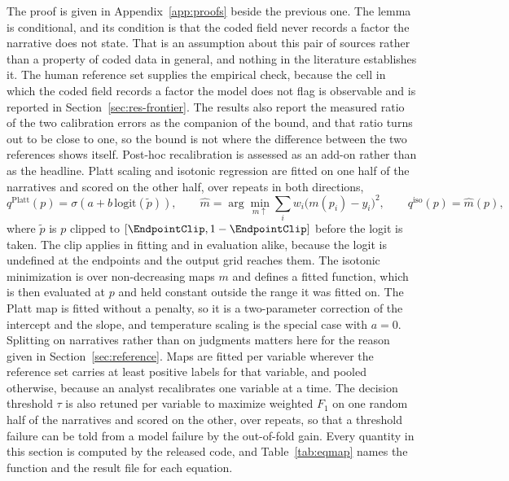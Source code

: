 The proof is given in Appendix~\ref{app:proofs} beside the previous one. The lemma is
conditional, and its condition is that the coded field never records a factor the narrative
does not state. That is an assumption about this pair of sources rather than a property of
coded data in general, and nothing in the literature establishes it. The human reference set
supplies the empirical check, because the cell in which the coded field records a factor the
model does not flag is observable and is reported in Section~\ref{sec:res-frontier}. The
results also report the measured ratio of the two calibration errors as the companion of the
bound, and that ratio turns out to be close to one, so the bound is not where the difference
between the two references shows itself. Post-hoc recalibration is assessed as an
add-on rather than as the headline. Platt scaling and isotonic regression are fitted on one half of the narratives and scored on
the other half, over \RecalRepeats{} repeats in both directions,
\begin{equation}
q^{\mathrm{Platt}}(p) = \sigma\!\left(a + b\,\mathrm{logit}(\tilde{p})\right),\qquad
\hat{m} = \arg\min_{m \uparrow} \sum_i w_i \bigl(m(p_i) - y_i\bigr)^2,\qquad
q^{\mathrm{iso}}(p) = \hat{m}(p),
\label{eq:platt}
\end{equation}
where $\tilde{p}$ is $p$ clipped to $[\EndpointClip, 1 - \EndpointClip]$ before the logit is
taken. The clip applies in fitting and in evaluation alike, because the logit is undefined at
the endpoints and the output grid reaches them. The isotonic minimization is over non-decreasing maps $m$ and
defines a fitted function, which is then evaluated at $p$ and held constant outside the range
it was fitted on. The Platt map is fitted without a penalty, so it is a two-parameter
correction of the intercept and the slope, and temperature scaling is the special case with
$a = 0$. Splitting on narratives rather than on judgments matters here for the reason given in
Section~\ref{sec:reference}. Maps are fitted per variable wherever the reference set carries at
least \RecalMinPositives{} positive labels for that variable, and pooled otherwise, because an
analyst recalibrates one variable at a time. The decision threshold $\tau$ is also retuned per
variable to maximize weighted $F_1$ on one random half of the narratives and scored on the
other, over \ThreshRepeats{} repeats, so that a threshold failure can be told from a model
failure by the out-of-fold gain. Every quantity in this section is computed by the released
code, and Table~\ref{tab:eqmap} names the function and the result file for each equation.


